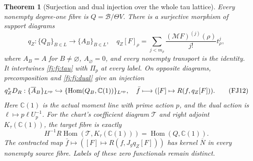 \documentclass[11pt,a4paper]{article}
\newtheorem{theorem}{Theorem}[section]
\theoremstyle{definition}\newtheorem{definition}[theorem]{Definition}
\newcommand{\C}{\mathbb C}\newcommand{\R}{\mathbb R}
\providecommand{\Hom}{\operatorname{Hom}}
\begin{document}
\begin{theorem}[Surjection and dual injection over the whole tau lattice]
\label{fj:thm:tau}
Every nonempty degree-one fibre is $Q=\mathscr B/\Theta V$.
There is a surjective morphism of support diagrams
\[
 q_Z:\{Q_B\}_{B\in L}\longrightarrow\{A_B\}_{B\in L},\quad
 q_Z[F]_\rho=\sum_{j<m_\rho}
       \frac{(\mathcal MF)^{(j)}(\rho)}{j!}t_\rho^j,
 \tag{FJ11}\label{fj:fj:jet}
\]
where $A_B=A$ for $B\ne\varnothing$, $A_\varnothing=0$,
and every nonempty transport is the identity.
It intertwines \eqref{fj:fj:tau} with $\Pi_p$ at every label.
On opposite diagrams, precomposition and \eqref{fj:fj:dual} give an injection
\[
 q_Z^*D_R:\{\overline A_B\}_{L^{\rm op}}\hookrightarrow
        \{\Hom(Q_B,\C(1))\}_{L^{\rm op}},\quad
 \bar f\longmapsto([F]\mapsto R(f,q_Z[F])).
 \tag{FJ12}\label{fj:fj:dual-tau}
\]
Here $\C(1)$ is the actual moment line with prime action $p$, and
the dual action is $\ell\mapsto p\ell U_p^{-1}$.
For the chart's coefficient diagram $\mathcal T$ and right adjoint
$K_\tau(\C(1))$, the target fibre is exactly
\[
 H^{-1}R\Hom(\mathcal T,K_\tau(\C(1)))=\Hom(Q,\C(1)).
\]
The contracted map $\bar f\mapsto([F]\mapsto R(f,J_gq_Z[F]))$
has kernel $\overline N$ in every nonempty source fibre. Labels of
these zero functionals remain distinct.
\end{theorem}
\end{document}
